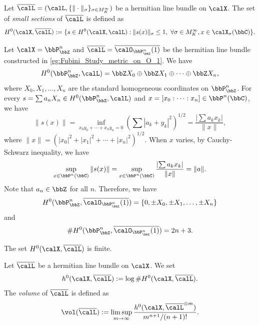     \begin{definition}\label{def:H^0_of_hermitian_line_bundles}
        Let \(\overline{\calL} = (\calL, \{\|\cdot\|_\sigma\}_{\sigma \in M_K^\infty})\) be a hermitian line bundle on \(\calX\).
        The set of \emph{small sections} of \(\overline{\calL}\) is defined as
        \[ H^0(\calX, \overline{\calL}) := \{ s \in H^0(\calX, \calL) : \|s(x)\|_{\sigma} \leq 1,\ \forall \sigma \in M_K^\infty, x \in \calX_\sigma(\bbC) \}. \]
    \end{definition}

    \begin{example}\label{eg:H^0_of_normed_O_1_on_P^n_Z}
        Let \(\calX = \bbP^n_{\bbZ}\) and \(\overline{\calL} = \overline{\calO_{\bbP^n_{\bbZ}}(1)}\) be the hermitian line bundle constructed in \cref{eg:Fubini_Study_metric_on_O_1}.
        We have 
        \[ H^0(\bbP^n_{\bbZ}, \calL) = \bbZ X_0 \oplus \bbZ X_1 \oplus \cdots \oplus \bbZ X_n, \]
        where \(X_0, X_1, \ldots, X_n\) are the standard homogeneous coordinates on \(\bbP^n_{\bbZ}\).
        For every \(s = \sum a_n X_n \in H^0(\bbP^n_{\bbZ}, \calL)\) and \(x = [x_0:\cdots:x_n] \in \bbP^n(\bbC)\), we have
        \[ \|s(x)\| = \inf_{x_0y_0+\cdots+x_ny_n = 0} \left( \sum |a_k + y_k|^2 \right)^{1/2} = \frac{\left|\sum a_kx_k\right|}{\|x\|}, \]
        where \(\|x\| = (|x_0|^2 + |x_1|^2 + \cdots + |x_n|^2)^{1/2}\).
        When \(x\) varies, by Cauchy-Schwarz inequality, we have 
        \[ \sup_{x \in \bbP^n(\bbC)} \|s(x)\| = \sup_{x \in \bbP^n(\bbC)} \frac{\left|\sum a_kx_k\right|}{\|x\|} = \|a\|.\]
        Note that \(a_n \in \bbZ\) for all \(n\).
        Therefore, we have
        \[ H^0(\bbP^n_{\bbZ}, \overline{\calO_{\bbP^n_{\bbZ}}(1)}) = \{0, \pm X_0, \pm X_1, \ldots, \pm X_n\} \]
        and 
        \[ \# H^0(\bbP^n_{\bbZ}, \overline{\calO_{\bbP^n_{\bbZ}}(1)}) = 2n + 3. \]
    \end{example}

    \begin{proposition}\label{def:H^0_of_hermitian_lb_is_finite}
        The set \(H^0(\calX, \overline{\calL})\) is finite.
    \end{proposition}

    \begin{definition}\label{def:h^0_and_volume_of_hermitian_line_bundles}
        Let \(\overline{\calL}\) be a hermitian line bundle on \(\calX\).
        We set 
        \[ h^0(\calX, \overline{\calL}) := \log \# H^0(\calX, \overline{\calL}). \]
        The \emph{volume} of \(\overline{\calL}\) is defined as
        \[ \vol(\overline{\calL}) := \limsup_{m \to \infty} \frac{h^0(\calX, \overline{\calL}^{\otimes m})}{m^{n+1}/(n+1)!}. \]
    \end{definition}

